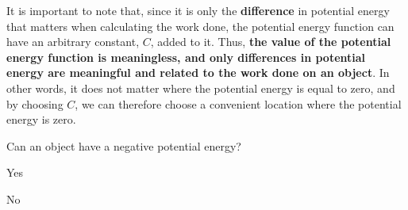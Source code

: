 It is important to note that, since it is only the \textbf{difference} in potential energy that matters when calculating the work done, the potential energy function can have an arbitrary constant, $C$, added to it. Thus, \textbf{the value of the potential energy function is meaningless, and only differences in potential energy are meaningful and related to the work done on an object}. In other words, it does not matter where the potential energy is equal to zero, and by choosing $C$, we can therefore choose a convenient location where the potential energy is zero.

\begin{checkpoint}
\begin{MCquestion}{Can an object have a negative potential energy?}
\item Yes \correct %
\item No
\end{MCquestion}
\end{checkpoint}

